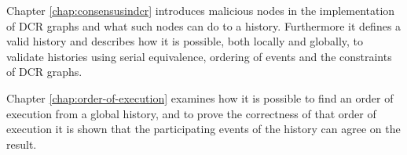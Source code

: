 	\newpar{}
	Chapter \ref{chap:consensusindcr} introduces malicious nodes in the implementation of DCR graphs and what such nodes can do to a history. Furthermore it defines a valid history and describes how it is possible, both locally and globally, to validate histories using serial equivalence, ordering of events and the constraints of DCR graphs.
	
    \newpar
    Chapter \ref{chap:order-of-execution} examines how it is possible to find an order of execution from a global history, and to prove the correctness of that order of execution it is shown that the participating events of the history can agree on the result.
		
	